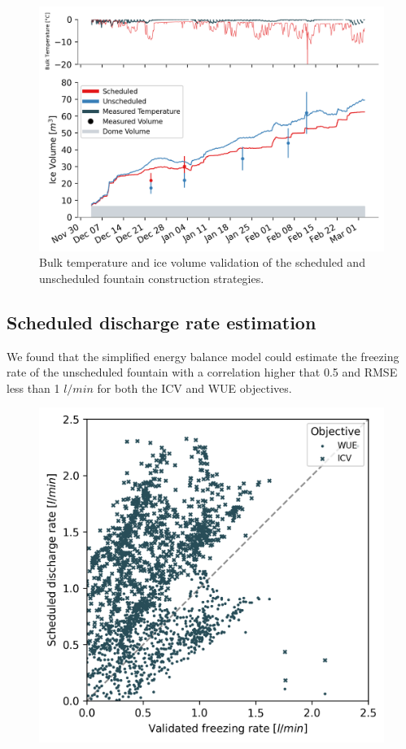 \documentclass[tc, manuscript]{copernicus}
\begin{document}
\begin{figure}[t]
\includegraphics[width=12cm]{Figures/validation.png}
\caption{Bulk temperature and ice volume validation of the scheduled and unscheduled fountain construction
strategies.}
\label{fig:iceV}
\end{figure}

\subsection{Scheduled discharge rate estimation}

We found that the simplified energy balance model could estimate the freezing rate of the unscheduled fountain with a
correlation higher that 0.5 and RMSE less than 1 $l/min$ for both the ICV and WUE objectives.

\begin{figure}[t]
\includegraphics[width=12cm]{Figures/freezing_rate_corr.png}
\caption{}
\label{fig:iceV}
\end{figure}
\end{document}
